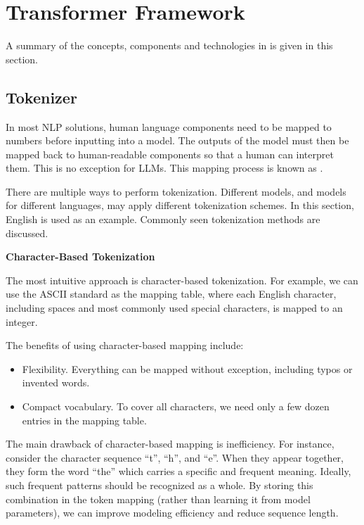 \section{Transformer Framework}

A summary of the concepts, components and technologies in \cite{vaswani2017attention} is given in this section.

\subsection{Tokenizer}

In most NLP solutions, human language components need to be mapped to numbers before inputting into a model. The outputs of the model must then be mapped back to human-readable components so that a human can interpret them. This is no exception for LLMs. This mapping process is known as .

There are multiple ways to perform tokenization. Different models, and models for different languages, may apply different tokenization schemes. In this section, English is used as an example. Commonly seen tokenization methods are discussed.

\vspace{0.1in}
\noindent \textbf{Character-Based Tokenization}
\vspace{0.1in}

The most intuitive approach is character-based tokenization. For example, we can use the ASCII standard as the mapping table, where each English character, including spaces and most commonly used special characters, is mapped to an integer.

The benefits of using character-based mapping include:
\begin{itemize}
	\item Flexibility. Everything can be mapped without exception, including typos or invented words.
	\item Compact vocabulary. To cover all characters, we need only a few dozen entries in the mapping table.
\end{itemize}

The main drawback of character-based mapping is inefficiency. For instance, consider the character sequence ``t'', ``h'', and ``e''. When they appear together, they form the word ``the'' which carries a specific and frequent meaning. Ideally, such frequent patterns should be recognized as a whole. By storing this combination in the token mapping (rather than learning it from model parameters), we can improve modeling efficiency and reduce sequence length.

